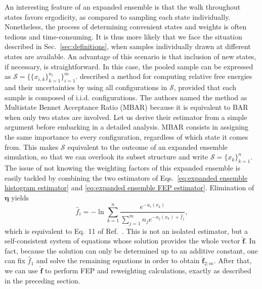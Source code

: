 \documentclass[journal=jctcce,manuscript=article,layout=twocolumn]{achemso}
\newcommand{\vt}[1]{\boldsymbol{\mathbf{#1}}}   %
\begin{document}
An interesting feature of an expanded ensemble is that the walk throughout states favors ergodicity, as compared to sampling each state individually. Nonetheless, the process of determining convenient states and weights is often tedious and time-consuming. It is thus more likely that we face the situation described in Sec.~\ref{sec:definitions}, when samples individually drawn at different states are available. An advantage of this scenario is that inclusion of new states, if necessary, is straightforward. In this case, the pooled sample can be expressed as $\mathcal S = \big\{\{x_{i,k}\}_{k=1}^{n_i} \big\}_{i=1}^m$. \citeauthor{Shirts_2008} \cite{Shirts_2008} described a method for computing relative free energies and their uncertainties by using all configurations in $\mathcal S$, provided that each sample is composed of i.i.d. configurations. The authors named the method as Multistate Bennet Acceptance Ratio (MBAR) because it is equivalent to BAR when only two states are involved. Let us derive their estimator from a simple argument before embarking in a detailed analysis. MBAR consists in assigning the same importance to every configuration, regardless of which state it comes from. This makes $\mathcal S$ equivalent to the outcome of an expanded ensemble simulation, so that we can overlook its subset structure and write $\mathcal S = \{x_k\}_{k=1}^n$. The issue of not knowing the weighting factors of this expanded ensemble is easily tackled by combining the two estimators of Eqs.~\eqref{eq:expanded ensemble histogram estimator} and \eqref{eq:expanded ensemble FEP estimator}. Elimination of $\vt \eta$ yields
\begin{equation}
\label{eq:mbar free energy estimator}
\hat f_i = -\ln \sum_{k=1}^n \frac{e^{-u_i(x_k)}}{\sum_{j=1}^m n_j e^{-u_j(x_k) + \hat f_j}},
\end{equation}
which is equivalent to Eq.~11 of Ref.~. This is not an isolated estimator, but a self-consistent system of equations whose solution provides the whole vector $\hat {\vt f}$. In fact, because the solution can only be determined up to an additive constant, one can fix $\hat f_1$ and solve the remaining equations in order to obtain $\hat{\vt f}_{2:m}$. After that, we can use $\hat{\vt f}$ to perform FEP and reweighting calculations, exactly as described in the preceding section.
\end{document}
